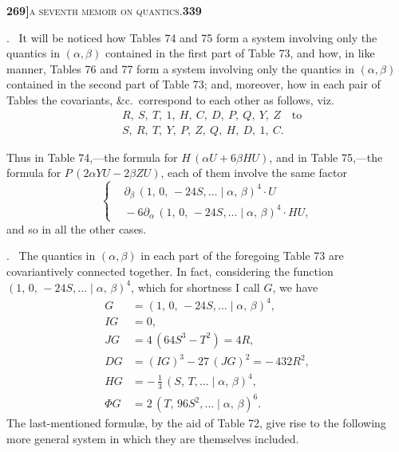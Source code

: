 \documentclass[11pt]{article}
\newcommand{\Cdel}{\mid}
\begin{document}
\newpage
\setcounter{page}{339}

\noindent\textbf{269]}\hfill\textsc{a seventh memoir on quantics.}\hfill\textbf{339}

\medskip

. \ It will be noticed how Tables 74 and 75 form a system involving only the quantics in $(\alpha, \beta)$ contained in the first part of Table 73, and how, in like manner, Tables 76 and 77 form a system involving only the quantics in $(\alpha, \beta)$ contained in the second part of Table 73; and, moreover, how in each pair of Tables the covariants, \&c.\ correspond to each other as follows, viz.
\[
\begin{aligned}
   &R,\ S,\ T,\ 1,\ H,\ C,\ D,\ P,\ Q,\ Y,\ Z\quad\text{to}\\
   &S,\ R,\ T,\ Y,\ P,\ Z,\ Q,\ H,\ D,\ 1,\ C.
\end{aligned}
\]

\medskip

\noindent Thus in Table 74,---the formula for $H\,(\alpha U + 6\beta H U)$, and in Table 75,---the formula for $P\,(2\alpha Y U - 2\beta Z U)$, each of them involve the same factor
\[
   \left\{\begin{aligned}&\partial_\beta\,(1,\,0,\,-24 S,\ldots\Cdel\alpha,\,\beta)^4\cdot U\\ &{} - 6\partial_\alpha\,(1,\,0,\,-24 S,\ldots\Cdel\alpha,\,\beta)^4\cdot H U,\end{aligned}\right.
\]
and so in all the other cases.

\medskip

. \ The quantics in $(\alpha, \beta)$ in each part of the foregoing Table 73 are covariantively connected together. In fact, considering the function $(1,\,0,\,-24 S,\ldots\Cdel\alpha,\,\beta)^4$, which for shortness I call $G$, we have
\[
\begin{aligned}
   G &= (1,\,0,\,-24 S,\ldots\Cdel\alpha,\,\beta)^4,\\
   I G &= 0,\\
   J G &= 4\,(64 S^3 - T^2) = 4 R,\\
   D G &= (I G)^3 - 27\,(J G)^2 = -\,432 R^2,\\
   H G &= -\,\tfrac{1}{3}\,(S,\,T,\ldots\Cdel\alpha,\,\beta)^4,\\
   \Phi G &= 2\,(T,\,96 S^2,\ldots\Cdel\alpha,\,\beta)^6.
\end{aligned}
\]
The last-mentioned formul\ae, by the aid of Table 72, give rise to the following more general system in which they are themselves included.
\end{document}
